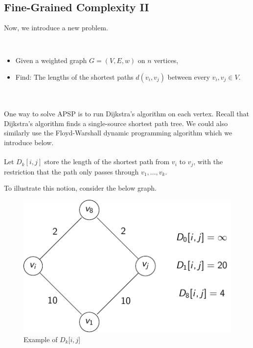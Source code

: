     \subsection{Fine-Grained Complexity II}

        Now, we introduce a new problem. 
        \begin{compprob} \label{prob:apsp}
            \vphantom
            \\
            \begin{itemize}
                \item Given a weighted graph \(G=(V,E,w)\) on \(n\) vertices,
                \item Find: The lengths of the shortest paths \(d(v_i,v_j)\) between every \(v_i,v_j\in V\).
            \end{itemize}
        \end{compprob}
        \vphantom
        \\
        \\
        One way to solve \textsc{APSP} is to run Dijkstra's algorithm on each vertex. Recall that Dijkstra's algorithm finds a single-source shortest path tree. We could also similarly use the Floyd-Warshall dynamic programming algorithm which we introduce below. 
        \\
        \\
        Let \(D_k[i,j]\) store the length of the shortest path from \(v_i\) to \(v_j\), with the restriction that the path only passes through \(v_1,\ldots,v_k\).
        \begin{example}
            To illustrate this notion, consider the below graph.
            \begin{figure}[H]
                \begin{center}
                    \includegraphics{Graphics/Figures/floyd_warshall/table_example.pdf}
                \end{center}
                \caption{Example of \(D_k[i,j\)]}
                \label{fig:example-floyd-warshall-table}
            \end{figure}
        \end{example}
